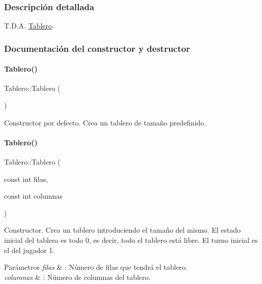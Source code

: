 \subsubsection{Descripción detallada}
T.\+D.\+A. \hyperlink{classTablero}{Tablero}. 

\subsubsection{Documentación del constructor y destructor}
\hypertarget{classTablero_ab4912f28f1db392e1dd44ddc98bd4f59}{}\label{classTablero_ab4912f28f1db392e1dd44ddc98bd4f59} 
\paragraph{\texorpdfstring{Tablero()}{Tablero()}\hspace{0.1cm}{\footnotesize\ttfamily [1/3]}}
{\footnotesize\ttfamily Tablero\+::\+Tablero (\begin{DoxyParamCaption}{ }\end{DoxyParamCaption})}



Constructor por defecto. Crea un tablero de tamaño predefinido. 

\hypertarget{classTablero_a51ae562c7dee2909d0fa335b8c3eaf71}{}\label{classTablero_a51ae562c7dee2909d0fa335b8c3eaf71} 
\paragraph{\texorpdfstring{Tablero()}{Tablero()}\hspace{0.1cm}{\footnotesize\ttfamily [2/3]}}
{\footnotesize\ttfamily Tablero\+::\+Tablero (\begin{DoxyParamCaption}\item[{const int}]{filas,  }\item[{const int}]{columnas }\end{DoxyParamCaption})}



Constructor. Crea un tablero introduciendo el tamaño del mismo. El estado inicial del tablero es todo 0, es decir, todo el tablero está libre. El turno inicial es el del jugador 1. 


\begin{DoxyParams}{Parámetros}
{\em filas} & \+: Número de filas que tendrá el tablero. \\
\hline
{\em columnas} & \+: Nümero de columnas del tablero. \\
\hline
\end{DoxyParams}
\hypertarget{classTablero_a95ccd1353038a966ad3304ead106c0d4}{}\label{classTablero_a95ccd1353038a966ad3304ead106c0d4} 
